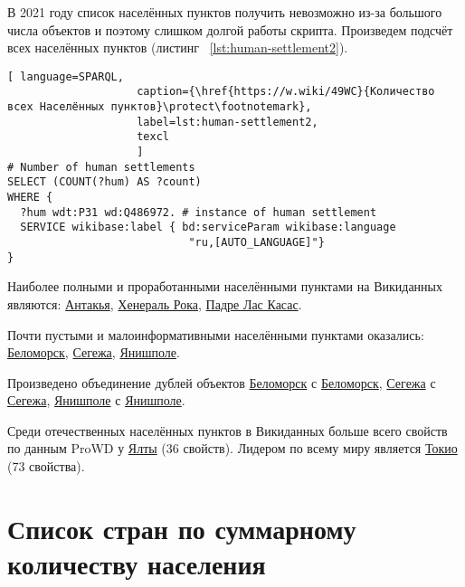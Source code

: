 В 2021 году список населённых пунктов получить невозможно из-за большого числа объектов и поэтому слишком долгой работы скрипта. Произведем подсчёт всех населённых пунктов (листинг ~\protect\ref{lst:human-settlement2}).

\begin{lstlisting}[ language=SPARQL, 
                    caption={\href{https://w.wiki/49WC}{Количество всех Населённых пунктов}\protect\footnotemark},
                    label=lst:human-settlement2,
                    texcl 
                    ]
# Number of human settlements
SELECT (COUNT(?hum) AS ?count) 
WHERE {
  ?hum wdt:P31 wd:Q486972. # instance of human settlement  
  SERVICE wikibase:label { bd:serviceParam wikibase:language 
							"ru,[AUTO_LANGUAGE]"}
}
\end{lstlisting}%

Наиболее полными и проработанными населёнными пунктами на Викиданных являются:  \href{http://www.wikidata.org/entity/Q80561}{Антакья}, \href{http://www.wikidata.org/entity/Q52506}{Хенераль Рока}, \href{http://www.wikidata.org/entity/Q51063}{Падре Лас Касас}.

Почти пустыми и малоинформативными населёнными пунктами оказались: \href{http://www.wikidata.org/entity/Q31913786}{Беломорск}, \href{http://www.wikidata.org/entity/Q37958167}{Сегежа}, \href{http://www.wikidata.org/entity/Q33522990}{Янишполе}.

Произведено объединение дублей объектов \href{http://www.wikidata.org/entity/Q31913786}{Беломорск} с \href{http://www.wikidata.org/entity/Q104773}{Беломорск}, \href{http://www.wikidata.org/entity/Q37958167}{Сегежа} с \href{http://www.wikidata.org/entity/Q193922}{Сегежа}, \href{http://www.wikidata.org/entity/Q33522990}{Янишполе} с \href{http://www.wikidata.org/entity/Q16024734}{Янишполе}.

Среди отечественных населённых пунктов в Викиданных больше всего свойств по данным ProWD у \href{http://www.wikidata.org/entity/Q128499}{Ялты} (\num{36} свойств). Лидером по всему миру является \href{http://www.wikidata.org/entity/Q1490}{Токио} (\num{73} свойства). \protect\footnotemark



\section{Список стран по суммарному количеству населения}

